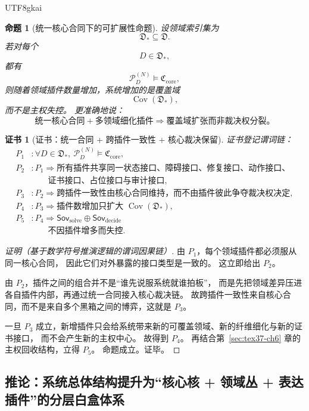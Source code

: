 \documentclass[12pt]{article}
\newtheorem{proposition}{命题}[section]
\newtheorem{Certificate}{证书}[section]
\begin{document}
\begin{CJK*}{UTF8}{gkai}
\begin{proposition}[统一核心合同下的可扩展性命题]
\label{prop:tex37-ch7-scalable}
设领域索引集为
\[
  \mathfrak D_* \subseteq \mathfrak D.
\]
若对每个
\[
  D\in\mathfrak D_*,
\]
都有
\[
  \mathcal P_D^{(N)}\models \mathfrak C_{\mathrm{core}},
\]
则随着领域插件数量增加，系统增加的是覆盖域
\[
  \operatorname{Cov}(\mathfrak D_*),
\]
而不是主权失控。
更准确地说：
\[
  \boxed{
    \text{统一核心合同}+\text{多领域细化插件}
    \Rightarrow
    \text{覆盖域扩张而非裁决权分裂。}
  }
\]
\end{proposition}

\begin{Certificate}[证书：统一合同 + 跨插件一致性 + 核心裁决保留]
\label{cert:tex37-ch7-scalable}
证书登记谓词链：
\[
\begin{aligned}
  P_1 &: \forall D\in\mathfrak D_*,\ \mathcal P_D^{(N)}\models \mathfrak C_{\mathrm{core}},\\
  P_2 &: P_1\Rightarrow \text{所有插件共享同一状态接口、障碍接口、修复接口、动作接口、}\\
  &\qquad \text{证书接口、占位接口与审计接口},\\
  P_3 &: P_2\Rightarrow \text{跨插件一致性由核心合同维持，而不由插件彼此争夺裁决权决定},\\
  P_4 &: P_3\Rightarrow \text{插件数增加只扩大 }\operatorname{Cov}(\mathfrak D_*),\\
  P_5 &: P_4\Rightarrow \mathsf{Sov}_{\mathrm{solve}}\oplus\mathsf{Sov}_{\mathrm{decide}}\\
  &\qquad \text{不因插件增多而失控}.
\end{aligned}
\]
\end{Certificate}

\begin{proof}[证明（基于数学符号推演逻辑的谓词因果链）]
由 $P_1$，每个领域插件都必须服从同一核心合同，
因此它们对外暴露的接口类型是一致的。
这立即给出 $P_2$。

由 $P_2$，插件之间的组合并不是“谁先说服系统就谁拍板”，
而是先把领域差异压进各自插件内部，再通过统一合同接入核心裁决链。
故跨插件一致性来自核心合同，而不是来自多个黑箱之间的博弈，这就是 $P_3$。

一旦 $P_3$ 成立，新增插件只会给系统带来新的可覆盖领域、新的纤维细化与新的证书接口，
而不会产生新的主权中心。
故得到 $P_4$。
再结合第~\ref{sec:tex37-ch6} 章的主权回收结构，立得 $P_5$。
命题成立。证毕。
\end{proof}

\subsection{推论：系统总体结构提升为“核心核 + 领域丛 + 表达插件”的分层白盒体系}
\label{subsec:tex37-ch7-corollary}


\end{CJK*}
\end{document}
